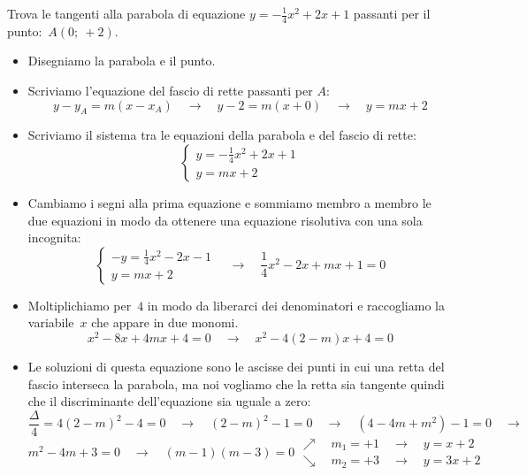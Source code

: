 \begin{esempio}
 Trova le tangenti alla parabola di equazione $y=-\frac{1}{4}x^2+2x +1$ 
 passanti per il punto:~$A(0;~+2)$.
 
 \begin{itemize}
  \item Disegniamo la parabola e il punto.
  \item Scriviamo l'equazione del fascio di rette passanti per $A$:
\[y-y_A = m(x-x_A) \quad \rightarrow \quad 
y-2 = m\left(x+0\right)
\quad \rightarrow \quad y=mx+2\]
  \item Scriviamo il sistema tra le equazioni della parabola e del fascio di 
   rette:
\[\left\{\begin{array}{l}
  y=-\frac{1}{4}x^2+2x +1\\
  y=mx+2
\end{array}\right. \]
  \item Cambiamo i segni alla prima equazione e sommiamo membro a membro le
   due equazioni in modo da ottenere una equazione risolutiva con una sola 
   incognita:
\[\left\{\begin{array}{l}
  -y=\frac{1}{4}x^2-2x-1\\
  y=mx+2
\end{array}\right. \quad \rightarrow \quad 
\frac{1}{4}x^2-2x+mx+1=0\]
  \item Moltiplichiamo per~$4$ in modo da liberarci dei denominatori e 
   raccogliamo la variabile~$x$ che appare in due monomi.
\[x^2-8x+4mx+4=0 \quad \rightarrow \quad x^2-4(2-m)x+4=0\]
  \item Le soluzioni di questa equazione sono le ascisse dei punti in cui una 
   retta del fascio interseca la parabola, ma noi vogliamo che la retta sia
   tangente quindi che il discriminante dell'equazione sia uguale a zero:
\[\frac{\Delta}{4}=4(2-m)^2-4=0 \quad \rightarrow \quad 
(2-m)^2-1=0 \quad \rightarrow \quad
(4-4m+m^2)-1=0 \quad \rightarrow \quad\]
\[m^2-4m+3=0 \quad \rightarrow \quad
(m-1)(m-3)=0 
 \begin{array}{l}
  \nearrow \quad m_1=+1 \quad \rightarrow \quad y=x+2\\
  \searrow \quad m_2=+3 \quad \rightarrow \quad y=3x+2
 \end{array}\]
 \end{itemize}
\end{esempio}

